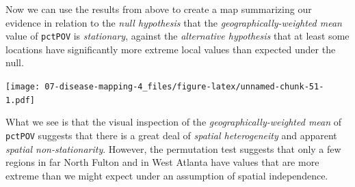 \documentclass[
]{book}
\newenvironment{Shaded}{\begin{snugshade}}{\end{snugshade}}
\newcommand{\AttributeTok}[1]{\textcolor[rgb]{0.13,0.29,0.53}{#1}}
\newcommand{\DecValTok}[1]{\textcolor[rgb]{0.00,0.00,0.81}{#1}}
\newcommand{\FunctionTok}[1]{\textcolor[rgb]{0.13,0.29,0.53}{\textbf{#1}}}
\newcommand{\NormalTok}[1]{#1}
\newcommand{\SpecialCharTok}[1]{\textcolor[rgb]{0.81,0.36,0.00}{\textbf{#1}}}
\newcommand{\StringTok}[1]{\textcolor[rgb]{0.31,0.60,0.02}{#1}}
\begin{document}
Now we can use the results from above to create a map summarizing our evidence in relation to the \emph{null hypothesis} that the \emph{geographically-weighted mean} value of \texttt{pctPOV} is \emph{stationary}, against the \emph{alternative hypothesis} that at least some locations have significantly more extreme local values than expected under the null.

\begin{Shaded}
\end{Shaded}

\texttt{[image: 07-disease-mapping-4\_files/figure-latex/unnamed-chunk-51-1.pdf]}

What we see is that the visual inspection of the \emph{geographically-weighted mean} of \texttt{pctPOV} suggests that there is a great deal of \emph{spatial heterogeneity} and apparent \emph{spatial non-stationarity}. However, the permutation test suggests that only a few regions in far North Fulton and in West Atlanta have values that are more extreme than we might expect under an assumption of spatial independence.
\end{document}
